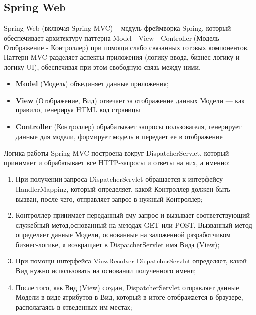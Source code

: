 \documentclass[a4paper]{article}
\begin{document}
\subsection{Spring Web}

Spring Web (включая Spring MVC) – модуль фреймворка Spring, который обеспечивает архитектуру паттерна Model - View - Controller (Модель - Отображение - Контроллер) при помощи слабо связанных готовых компонентов. Паттерн MVC разделяет аспекты приложения (логику ввода, бизнес-логику и логику UI), обеспечивая при этом свободную связь между ними.

\begin{itemize}
\setlength{\itemsep}{-2mm}
	\item\textbf{Model} (Модель) объединяет данные приложения;
	\item\textbf{View} (Отображение, Вид) отвечает за отображение данных Модели — как правило, генерируя HTML код страницы
	\item\textbf{Controller} (Контроллер) обрабатывает запросы пользователя, генерирует данные для модели, формирует модель и передает ее в отображение
\end{itemize}

Логика работы Spring MVC построена вокруг DispatcherServlet, который принимает
и обрабатывает все HTTP-запросы и ответы на них, а именно:

\begin{enumerate}
\setlength{\itemsep}{-2mm}
	\item При получении запроса DispatcherServlet обращается к интерфейсу HandlerMapping, который определяет, какой Контроллер должен быть вызван, после чего, отправляет запрос в нужный Контроллер;
	\item Контроллер принимает переданный ему запрос и вызывает соответствующий служебный метод,основанный на методах GET или POST. Вызванный метод определяет данные Модели, основанные на заложенной разработчиком бизнес-логике, и возвращает в DispatcherServlet имя Вида (View);
	\item При помощи интерфейса ViewResolver DispatcherServlet определяет, какой Вид нужно использовать на основании полученного имени;
	\item После того, как Вид (View) создан, DispatcherServlet отправляет данные Модели в виде атрибутов в Вид, который в итоге отображается в браузере, располагаясь в отведенных им местах;
\end{enumerate}
\end{document}
